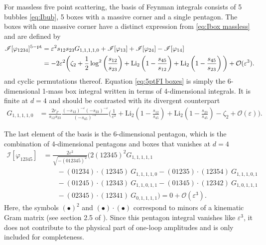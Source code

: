 \documentclass[11pt]{article}
\newcommand{\nn}{\nonumber}
\renewcommand{\O}{\mathcal{O}}
\newcommand{\vphi}{\varphi}
\newcommand{\vep}{\varepsilon}
\begin{document}
For massless five point scattering, the basis of Feynman integrals consists of 5 bubbles \eqref{eq:Ibub}, 5 boxes with a massive corner and a single pentagon.
The boxes with one massive corner have a distinct expression from \eqref{eq:Ibox massless} and are defined by 
\begin{align} 
	\mathscr{I}[\vphi_{1234}]^{\rm 5-pt}	
		&= \vep^2 s_{12} s_{23} G_{1,1,1,1,0} 
		+ \mathscr{I}[\vphi_{13}]
		+ \mathscr{I}[\vphi_{24}] 
		- \mathscr{I}[\vphi_{14}]
	\label{eq:5ptFI boxes}
	\\ 
	&= -2\vep^2
	\bigg(
		\zeta_2 
		+ \frac12 \log^2\left(\frac{s_{12}}{s_{23}}\right)
		+ \text{Li}_2\left(1-\frac{s_{45}}{s_{12}}\right)
		+ \text{Li}_2\left(1-\frac{s_{45}}{s_{23}}\right)
	\bigg)
	+ \O(\vep^3).
	\nn
\end{align}
and cyclic permutations thereof.
Equation \eqref{eq:5ptFI boxes} is simply the 6-dimensional 1-mass box integral written in terms of 4-dimensional integrals. It is finite at $d=4$ and should be contrasted with its divergent counterpart
\begin{align}
	G_{1,1,1,1,0}
	&= \frac{2r_\Gamma}{s_{12} s_{23}} \frac{(- s_{12})^{-\vep}(- s_{23})^{-\vep}}{(- s_{45})^{-\vep}}
	\bigg( 
		\frac{1}{\vep^2} 
		+ \text{Li}_{2}\left(1-\frac{s_{12}}{s_{45}}\right) 
		+ \text{Li}_{2}\left(1-\frac{ s_{23}}{s_{45}}\right) 
		- \zeta_2 +\O(\vep)
	\bigg).
\end{align}

The last element of the basis is the 6-dimensional pentagon, which is the combination of 4-dimensional pentagons and boxes that vanishes at $d=4$ \cite{vanNeerven:1983vr}
\begin{align} \label{eq:5ptFI pentagon}
	\mathscr{I}[\vphi_{12345}] &= \frac{2\vep^2}{\sqrt{-(012345)^2}} \bigg(
		2(12345)^2 G_{1,1,1,1,1}
	\nn\\&\qquad
	- (01234)\cdot(12345)\ G_{1,1,1,1,0}
	- (01235)\cdot(12354)\ G_{1,1,1,0,1}
	\nn\\&\qquad
	- (01245)\cdot(12343)\ G_{1,1,0,1,1}
	- (01345)\cdot(12342)\ G_{1,0,1,1,1}
	\nn\\&\qquad
	- (02345)\cdot(12341)\ G_{0,1,1,1,1}
	\bigg) = 0 + \O(\vep^3).
\end{align}
Here, the symbols $(\bullet)^2$ and $(\bullet)\cdot(\bullet)$ correspond to minors of a kinematic Gram matrix (see section 2.5 of \cite{Caron-Huot:2021xqj}). Since this pentagon integral vanishes like $\vep^3$, it does not contribute to the physical part of one-loop amplitudes and is only included for completeness. 
\end{document}
